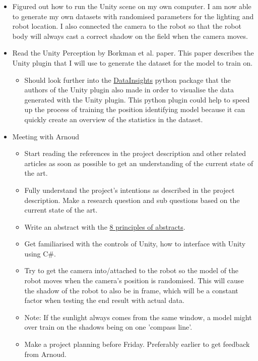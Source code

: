 \documentclass[twoside]{report}
\begin{document}
\begin{itemize}
    \item Figured out how to run the Unity scene on my own computer. I am now able to generate my own datasets with randomised parameters for the lighting and robot location. I also connected the camera to the robot so that the robot body will always cast a correct shadow on the field when the camera moves.

    \item Read the Unity Perception by Borkman et al. paper. This paper describes the Unity plugin that I will use to generate the dataset for the model to train on.
    \begin{itemize}
        \item Should look further into the \href{https://github.com/Unity-Technologies/datasetinsights}{DataInsights} python package that the authors of the Unity plugin also made in order to visualise the data generated with the Unity plugin. This python plugin could help to speed up the process of training the position identifying model because it can quickly create an overview of the statistics in the dataset. 
        
    \end{itemize}

    \item Meeting with Arnoud %
    \begin{itemize}
        \item Start reading the references in the project description and other related articles as soon as possible to get an understanding of the current state of the art.
        \item Fully understand the project's intentions as described in the project description. Make a research question and sub questions based on the current state of the art.
        \item Write an abstract with the \href{http://augmentedtrader.wordpress.com/2012/02/07/8-elements-of-successful-abstracts/}{8 principles of abstracts}.
        \item Get familiarised with the controls of Unity, how to interface with Unity using C\#.
        \item Try to get the camera into/attached to the robot so the model of the robot moves when the camera's position is randomised. This will cause the shadow of the robot to also be in frame, which will be a constant factor when testing the end result with actual data.
        \item Note: If the sunlight always comes from the same window, a model might over train on the shadows being on one 'compass line'.
        \item Make a project planning before Friday. Preferably earlier to get feedback from Arnoud.
    \end{itemize}
\end{itemize}
\end{document}
